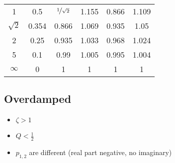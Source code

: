 \documentclass{article}[11pt]
\begin{document}
\begin{table}[H]
\begin{tabular}{cccccc}
1                        & 0.5                       & $\nicefrac{1}{\sqrt{2}}$                   & 1.155                                                                                            & 0.866                                      & 1.109                                                                                            \\  
$\sqrt{2}$               & 0.354                     & 0.866                                      & 1.069                                                                                            & 0.935                                      & 1.05                                                                                             \\
2                        & 0.25                      & 0.935                                      & 1.033                                                                                            & 0.968                                      & 1.024                                                                                            \\ 
5                        & 0.1                       & 0.99                                       & 1.005                                                                                            & 0.995                                      & 1.004                                                                                            \\ 
$\infty$                 & 0                         & 1                                          & 1                                                                                                & 1                                          & 1                                                                                                \\ \toprule
\end{tabular}
\label{tab:char-fs}
\end{table}


\subsection{Overdamped}\label{subsec:steady-state:overdamped}

\begin{itemize}
  \item $\zeta > 1$
  \item $Q < \frac{1}{2}$  
  \item $p_{1,2}$ are different (real part negative, no imaginary)
\end{itemize}
\end{document}
